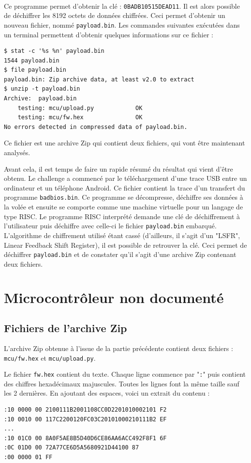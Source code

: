 \documentclass[a4paper,10pt]{article}
\newcommand{\pyinput}[1]{%
    \noindent{\color[rgb]{0.5, 0.5, 0.5}{\rule{\textwidth}{0.4pt}}}
     \\
    \noindent{\color[rgb]{0.5, 0.5, 0.5}{\rule{\textwidth}{0.4pt}}}
}
\begin{document}
\pyinput{2_arm64/find_badbios_key.py.inc.tex}

Ce programme permet d'obtenir la clé : \texttt{0BADB10515DEAD11}. Il est alors possible de déchiffrer les 8192 octets de données chiffrées. Ceci permet d'obtenir un nouveau fichier, nommé \texttt{payload.bin}. Les commandes suivantes exécutées dans un terminal permettent d'obtenir quelques informations sur ce fichier :

\begin{verbatim}
$ stat -c '%s %n' payload.bin
1544 payload.bin
$ file payload.bin
payload.bin: Zip archive data, at least v2.0 to extract
$ unzip -t payload.bin
Archive:  payload.bin
    testing: mcu/upload.py            OK
    testing: mcu/fw.hex               OK
No errors detected in compressed data of payload.bin.
\end{verbatim}

Ce fichier est une archive Zip qui contient deux fichiers, qui vont être maintenant analysés.

Avant cela, il est temps de faire un rapide résumé du résultat qui vient d'être obtenu. Le challenge a commencé par le téléchargement d'une trace USB entre un ordinateur et un téléphone Android. Ce fichier contient la trace d'un transfert du programme \texttt{badbios.bin}. Ce programme se décompresse, déchiffre ses données à la volée et ensuite se comporte comme une machine virtuelle pour un langage de type RISC. Le programme RISC interprété demande une clé de déchiffrement à l'utilisateur puis déchiffre avec celle-ci le fichier \texttt{payload.bin} embarqué. L'algorithme de chiffrement utilisé étant cassé (d'ailleurs, il s'agit d'un "LSFR", Linear Feedback Shift Register), il est possible de retrouver la clé. Ceci permet de déchiffrer \texttt{payload.bin} et de constater qu'il s'agit d'une archive Zip contenant deux fichiers.

\clearpage
\section{Microcontrôleur non documenté}

\subsection{Fichiers de l'archive Zip}
\label{firmzip}

L'archive Zip obtenue à l'issue de la partie précédente contient deux fichiers : \texttt{mcu/fw.hex} et \texttt{mcu/upload.py}.

Le fichier \texttt{fw.hex} contient du texte. Chaque ligne commence par "\texttt{:}" puis contient des chiffres hexadécimaux majuscules. Toutes les lignes font la même taille sauf les 2 dernières. En ajoutant des espaces, voici un extrait du contenu :
\begin{verbatim}
:10 0000 00 2100111B2001108CC0D2201010002101 F2
:10 0010 00 117C2200120FC03C20101000210111B2 EF
...
:10 01C0 00 8A0F5AE8B5D40D6CE86AA6ACC492F8F1 6F
:0C 01D0 00 72A77CE6D5A5680921D44100 87
:00 0000 01 FF
\end{verbatim}
\end{document}

